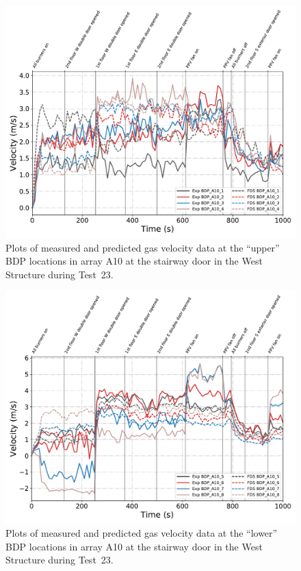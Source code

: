 \begin{figure}[!h]
	\centering
	\includegraphics[width=\columnwidth]{Figures/Plots/Validation/Velocity/Test_23_BDP_A10_upper}
	\caption[Plots of measured and predicted gas velocity data at ``upper'' BDP locations in A10 during Test~23.]{Plots of measured and predicted gas velocity data at the ``upper'' BDP locations in array A10 at the stairway door in the West Structure during Test~23.}
	\label{fig:Test23_upper_BDPs}
\end{figure}

\begin{figure}[!h]
	\centering
	\includegraphics[width=\columnwidth]{Figures/Plots/Validation/Velocity/Test_23_BDP_A10_lower}
	\caption[Plots of measured and predicted gas velocity data at ``lower'' BDP locations in A10 during Test~23.]{Plots of measured and predicted gas velocity data at the ``lower'' BDP locations in array A10 at the stairway door in the West Structure during Test~23.}
	\label{fig:Test23_lower_BDPs}
\end{figure}

